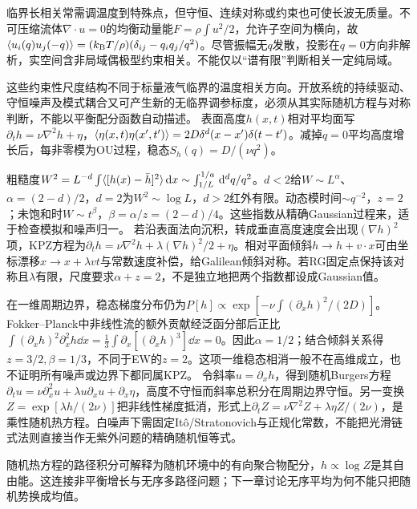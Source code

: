 \label{ch:growth}
临界长相关常需调温度到特殊点，但守恒、连续对称或约束也可使长波无质量。不可压缩流体$\nabla\cdot u=0$的均衡动量能$F=\rho\int u^2/2$，允许子空间为横向，故$\langle u_i(q)u_j(-q)\rangle=(k_{\mathrm B} T/\rho)(\delta_{ij}-q_iq_j/q^2)$。尽管振幅无$q$发散，投影在$q=0$方向非解析，实空间含非局域偶极型约束相关。不能仅以“谱有限”判断相关一定纯局域。

这些约束性尺度结构不同于标量液气临界的温度相关方向。开放系统的持续驱动、守恒噪声及模式耦合又可产生新的无临界调参标度，必须从其实际随机方程与对称判断，不能以平衡配分函数自动描述。
表面高度$h(x,t)$相对平均面写$\partial_th=\nu\nabla^2h+\eta$，$\langle \eta(x,t)\eta(x',t')\rangle=2D\delta^d(x-x')\delta(t-t')$。减掉$q=0$平均高度增长后，每非零模为OU过程，稳态$S_h(q)=D/(\nu q^2)$。

粗糙度$W^2=L^{-d}\int\langle [h(x)-\bar h]^2\rangle\,\mathrm d x\sim\int_{1/L}^{1/a}\,\mathrm d^dq/q^2$。$d<2$给$W\sim L^\alpha$、$\alpha=(2-d)/2$，$d=2$为$W^2\sim\log L$，$d>2$红外有限。动态模时间$\sim q^{-2}$，$z=2$；未饱和时$W\sim t^\beta$，$\beta=\alpha/z=(2-d)/4$。这些指数从精确Gaussian过程来，适于检查模拟和噪声归一。
若沿表面法向沉积，转成垂直高度速度会出现$(\nabla h)^2$项，KPZ方程为$\partial_th=\nu\nabla^2h+\lambda(\nabla h)^2/2+\eta$。相对平面倾斜$h\to h+v\cdot x$可由坐标漂移$x\to x+\lambda vt$与常数速度补偿，给Galilean倾斜对称。若RG固定点保持该对称且$\lambda$有限，尺度要求$\alpha+z=2$，不是独立地把两个指数都设成Gaussian值。

在一维周期边界，稳态梯度分布仍为$P[h]\propto\exp[-\nu\int(\partial_xh)^2/(2D)]$。Fokker--Planck中非线性流的额外贡献经泛函分部后正比$\int(\partial_xh)^2\partial_x^2h\dd x=\frac13\int\partial_x[(\partial_xh)^3]\dd x=0$。因此$\alpha=1/2$；结合倾斜关系得$z=3/2,\beta=1/3$，不同于EW的$z=2$。这项一维稳态相消一般不在高维成立，也不证明所有噪声或边界下都同属KPZ。
令斜率$u=\partial_xh$，得到随机Burgers方程$\partial_tu=\nu\partial_x^2u+\lambda u\partial_xu+\partial_x\eta$，高度不守恒而斜率总积分在周期边界守恒。另一变换$Z=\exp[\lambda h/(2\nu)]$把非线性梯度抵消，形式上$\partial_tZ=\nu\nabla^2Z+\lambda\eta Z/(2\nu)$，是乘性随机热方程。白噪声下需固定Itô/Stratonovich与正规化常数，不能把光滑链式法则直接当作无紫外问题的精确随机恒等式。

随机热方程的路径积分可解释为随机环境中的有向聚合物配分，$h\propto\log Z$是其自由能。这连接非平衡增长与无序多路径问题；下一章讨论无序平均为何不能只把随机势换成均值。
